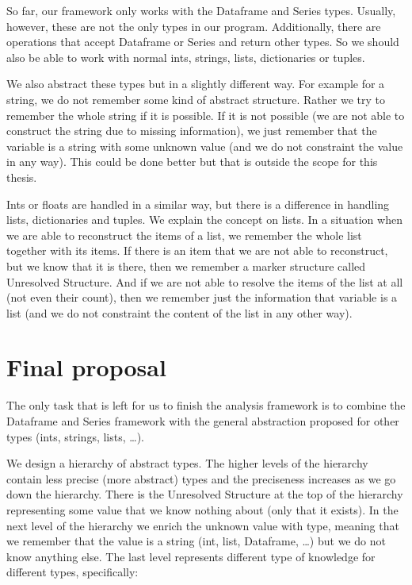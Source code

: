 So far, our framework only works with the Dataframe and Series types.
Usually, however, these are not the only types in our program.
Additionally, there are operations that accept Dataframe or Series and return other types.
So we should also be able to work with normal ints, strings, lists, dictionaries or tuples.

We also abstract these types but in a slightly different way.
For example for a string, we do not remember some kind of abstract structure.
Rather we try to remember the whole string if it is possible.
If it is not possible (we are not able to construct the string due to missing information), we just remember that the
variable is a string with some unknown value (and we do not constraint the value in any way).
This could be done better but that is outside the scope for this thesis.

Ints or floats are handled in a similar way, but there is a difference in handling lists, dictionaries and tuples.
We explain the concept on lists.
In a situation when we are able to reconstruct the items of a list, we remember the whole list together with its items.
If there is an item that we are not able to reconstruct, but we know that it is there, then we remember a marker
structure called Unresolved Structure.
And if we are not able to resolve the items of the list at all (not even their count), then we remember just the
information that variable is a list (and we do not constraint the content of the list in any other way).

\section{Final proposal}

The only task that is left for us to finish the analysis framework is to combine the Dataframe and Series framework
with the general abstraction proposed for other types (ints, strings, lists, \ldots).

We design a hierarchy of abstract types.
The higher levels of the hierarchy contain less precise (more abstract) types and the preciseness increases as we go
down the hierarchy.
There is the Unresolved Structure at the top of the hierarchy representing some value that we know nothing about (only
that it exists).
In the next level of the hierarchy we enrich the unknown value with type, meaning that we remember that the value
is a string (int, list, Dataframe, \ldots) but we do not know anything else.
The last level represents different type of knowledge for different types, specifically:

